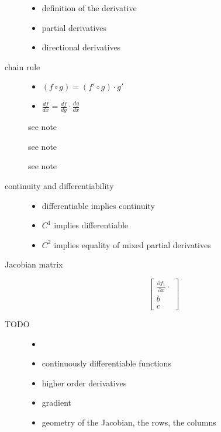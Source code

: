 \begin{description}
\item[]\hfill
	\begin{itemize}
		\item definition of the derivative
		\item partial derivatives
		\item directional derivatives
	\end{itemize}
\item[chain rule]\hfill
	\begin{itemize}
	\item$(f\circ g) = (f' \circ g)\cdot g'$
	\item$\frac{d f}{d x} = \frac{d f}{d g}\cdot \frac{d g}{d x}$
	\end{itemize}
\item[] see note
\item[] see note
\item[] see note
\item[continuity and differentiability]\hfill
	\begin{itemize}
	\item differentiable implies continuity
	\item $C^1$ implies differentiable
	\item $C^2$ implies equality of mixed partial derivatives
	\end{itemize}
\item[Jacobian matrix]\hfill
	\begin{equation}
	 \begin{bmatrix*}
	  \frac{\partial f_1}{\partial  x} \cdot \\
	  b\\
	  c
	 \end{bmatrix*}
	\end{equation}

\item[TODO]\hfill
	\begin{itemize} 
	\item 
	\item continuously differentiable functions
	\item higher order derivatives
	\item gradient
	\item geometry of the Jacobian, the rows, the columns
	\end{itemize}
\end{description}


